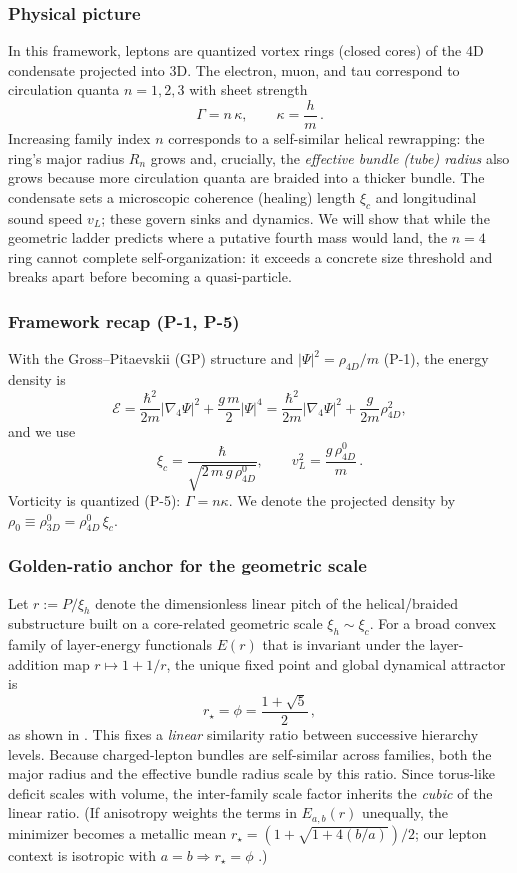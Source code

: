 \subsubsection{Physical picture}
In this framework, leptons are quantized vortex rings (closed cores) of the 4D condensate projected into 3D. The electron, muon, and tau correspond to circulation quanta \(n=1,2,3\) with sheet strength
\[
\Gamma=n\,\kappa,\qquad \kappa=\frac{h}{m}\,.
\]
Increasing family index \(n\) corresponds to a self-similar helical rewrapping: the ring’s major radius \(R_n\) grows and, crucially, the \emph{effective bundle (tube) radius} also grows because more circulation quanta are braided into a thicker bundle. The condensate sets a microscopic coherence (healing) length \(\xi_c\) and longitudinal sound speed \(v_L\); these govern sinks and dynamics. We will show that while the geometric ladder predicts where a putative fourth mass would land, the \(n{=}4\) ring cannot complete self-organization: it exceeds a concrete size threshold and breaks apart before becoming a quasi-particle.

\subsubsection{Framework recap (P-1, P-5)}
With the Gross–Pitaevskii (GP) structure and \(|\Psi|^2=\rho_{4D}/m\) (P-1), the energy density is
\[
\mathcal E=\frac{\hbar^2}{2m}|\nabla_4\Psi|^2+\frac{g\,m}{2}|\Psi|^4
=\frac{\hbar^2}{2m}|\nabla_4\Psi|^2+\frac{g}{2m}\rho_{4D}^2,
\]
and we use
\[
\xi_c=\frac{\hbar}{\sqrt{2\,m\,g\,\rho_{4D}^0}},\qquad
v_L^2=\frac{g\,\rho_{4D}^0}{m}\,.
\]
Vorticity is quantized (P-5): \(\Gamma=n\kappa\). We denote the projected density by \(\rho_0\equiv\rho_{3D}^0=\rho_{4D}^0\,\xi_c\).

\subsubsection{Golden-ratio anchor for the geometric scale}
Let \(r:=P/\xi_h\) denote the dimensionless linear pitch of the helical/braided substructure built on a core-related geometric scale \(\xi_h\sim\xi_c\). For a broad convex family of layer-energy functionals \(E(r)\) that is invariant under the layer-addition map \(r\mapsto 1+1/r\), the unique fixed point and global dynamical attractor is
\[
r_\star=\phi=\frac{1+\sqrt{5}}{2}\,,
\]
as shown in \cite{Norris2025GoldenRatio}. This fixes a \emph{linear} similarity ratio between successive hierarchy levels. Because charged-lepton bundles are self-similar across families, both the major radius and the effective bundle radius scale by this ratio. Since torus-like deficit scales with volume, the inter-family scale factor inherits the \emph{cubic} of the linear ratio. (If anisotropy weights the terms in \(E_{a,b}(r)\) unequally, the minimizer becomes a metallic mean \(r_\star=(1+\sqrt{1+4(b/a)})/2\); our lepton context is isotropic with \(a=b\Rightarrow r_\star=\phi\) \cite{Norris2025GoldenRatio}.)

